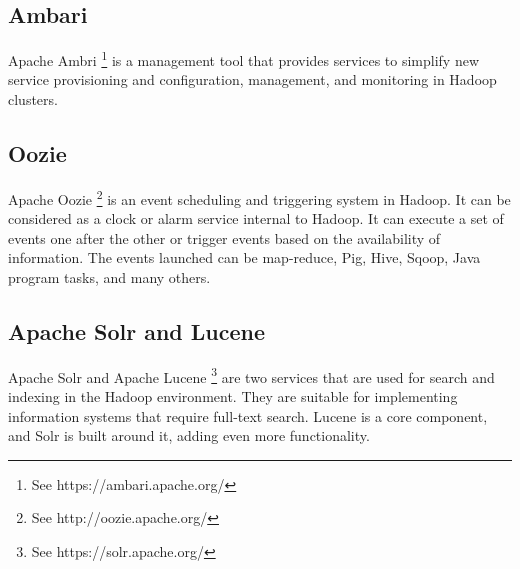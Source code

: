\documentclass[12pt,english]{book}
\begin{document}



\subsection{Ambari}

Apache Ambri \footnote{See https://ambari.apache.org/} is a management tool that provides services to simplify new service provisioning and configuration, management, and monitoring in Hadoop clusters.

\subsection{Oozie}

Apache Oozie \footnote{See http://oozie.apache.org/} is an event scheduling and triggering system in Hadoop.
It can be considered as a clock or alarm service internal to Hadoop.
It can execute a set of events one after the other or trigger events based on the availability of information.
The events launched can be map-reduce, Pig, Hive, Sqoop, Java program tasks, and many others.

\subsection{Apache Solr and Lucene}

Apache Solr and Apache Lucene \footnote{See https://solr.apache.org/} are two services that are used for search and indexing in the Hadoop environment. 
They are suitable for implementing information systems that require full-text search.
Lucene is a core component, and Solr is built around it, adding even more functionality.  
\end{document}
